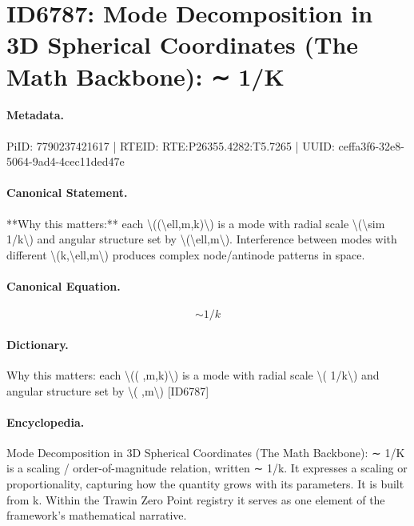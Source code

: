 \section*{ID6787: Mode Decomposition in 3D Spherical Coordinates (The Math Backbone): ∼ 1/K}
\paragraph{Metadata.}
PiID: 7790237421617 | RTEID: RTE:P26355.4282:T5.7265 | UUID: ceffa3f6-32e8-5064-9ad4-4cec11ded47e

\paragraph{Canonical Statement.}
**Why this matters:** each \textbackslash{}((\textbackslash{}ell,m,k)\textbackslash{}) is a mode with radial scale \textbackslash{}(\textbackslash{}sim 1/k\textbackslash{}) and angular structure set by \textbackslash{}(\textbackslash{}ell,m\textbackslash{}). Interference between modes with different \textbackslash{}(k,\textbackslash{}ell,m\textbackslash{}) produces complex node/antinode patterns in space.

\paragraph{Canonical Equation.}
\[
\sim 1/k
\]

\paragraph{Dictionary.}
Why this matters: each \textbackslash{}(( ,m,k)\textbackslash{}) is a mode with radial scale \textbackslash{}( 1/k\textbackslash{}) and angular structure set by \textbackslash{}( ,m\textbackslash{}) [ID6787]

\paragraph{Encyclopedia.}
Mode Decomposition in 3D Spherical Coordinates (The Math Backbone): ∼ 1/K is a scaling / order-of-magnitude relation, written ∼ 1/k. It expresses a scaling or proportionality, capturing how the quantity grows with its parameters. It is built from k. Within the Trawin Zero Point registry it serves as one element of the framework's mathematical narrative.
